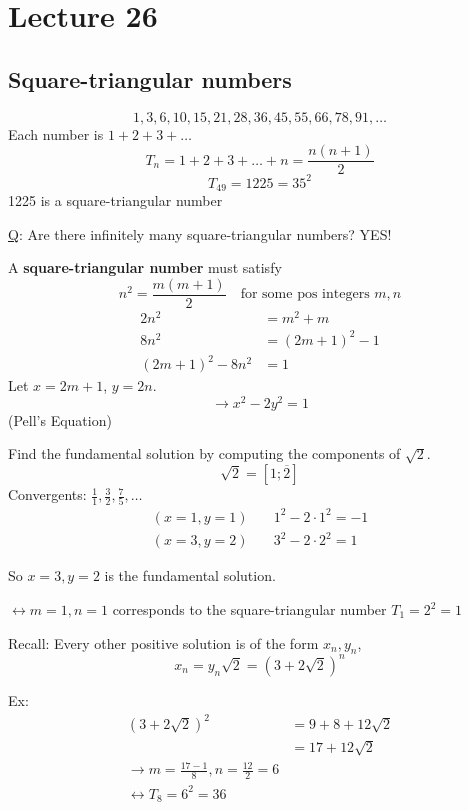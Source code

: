 \chapter{Lecture 26}
\date{December 5, 2024}

\section{Square-triangular numbers}
    \[
        1,3,6,10,15,21,28,36,45,55,66,78,91,\dots
    \]
    Each number is $1 + 2 + 3 + \dots$
    \[
        T_n = 1+2+3+\dots+n = \frac{n(n+1)}{2}
    \]
    \[
        T_49 = 1225 = 35^2
    \]
    1225 is a square-triangular number 

    \underline{Q}: Are there infinitely many square-triangular numbers? YES! 

    A \textbf{square-triangular number} must satisfy
    \[
        n^2 = \frac{m(m+1)}{2} \quad\text{for some pos integers } m,n
    \]
    \begin{align*}
        2n^2 &= m^2 + m \\
        8n^2 &= (2m+1)^2 - 1 \\
        (2m+1)^2 - 8n^2 &= 1
    \end{align*}
    Let $x = 2m+1$, $y=2n$. 
    \[
        \rightarrow x^2-2y^2 = 1
    \]
    (Pell's Equation)

    Find the fundamental solution by computing the components of $\sqrt{2}$.
    \[
        \sqrt{2} = [1; \overline{2}]
    \]
    Convergents: $\frac{1}{1}, \frac{3}{2}, \frac{7}{5}, \dots$ 
    \begin{align*}
        (x=1, y=1) &\quad 1^2 - 2\cdot 1^2 = -1 \\
        (x=3, y=2) &\quad 3^2 - 2\cdot 2^2 = 1 
    \end{align*}
    
    So $x = 3, y = 2$ is the fundamental solution. 

    $\leftrightarrow m = 1, n = 1$ corresponds to the square-triangular number $T_1 = 2^2 = 1$

    Recall: Every other positive solution is of the form $x_n, y_n$, 
    \[
        x_n = y_n\sqrt{2} = (3+2\sqrt{2})^n
    \]

    Ex: 
    \begin{align*}
        (3+2\sqrt{2})^2 &= 9+8+12\sqrt{2} \\
        &= 17 + 12\sqrt{2} \\
        \rightarrow m = \frac{17-1}{8}, n = \frac{12}{2} = 6 \\
        \leftrightarrow T_8 = 6^2 = 36
    \end{align*}

